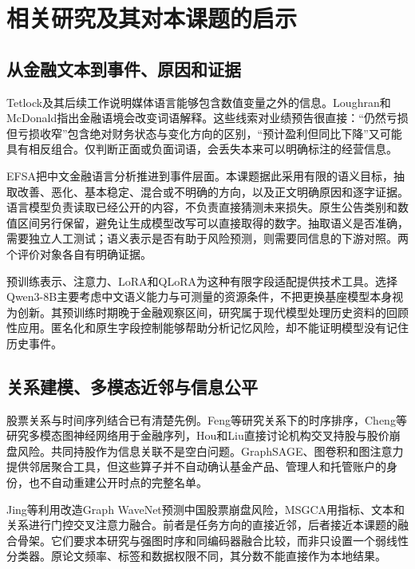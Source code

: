 \section{相关研究及其对本课题的启示}
\subsection{从金融文本到事件、原因和证据}
Tetlock及其后续工作说明媒体语言能够包含数值变量之外的信息\cite{r5,r6}。Loughran和McDonald指出金融语境会改变词语解释\cite{r7}。这些线索对业绩预告很直接：“仍然亏损但亏损收窄”包含绝对财务状态与变化方向的区别，“预计盈利但同比下降”又可能具有相反组合。仅判断正面或负面词语，会丢失本来可以明确标注的经营信息。

EFSA把中文金融语言分析推进到事件层面\cite{r24}。本课题据此采用有限的语义目标，抽取改善、恶化、基本稳定、混合或不明确的方向，以及正文明确原因和逐字证据。语言模型负责读取已经公开的内容，不负责直接猜测未来损失。原生公告类别和数值区间另行保留，避免让生成模型改写可以直接取得的数字。抽取语义是否准确，需要独立人工测试；语义表示是否有助于风险预测，则需要同信息的下游对照。两个评价对象各自有明确证据。

预训练表示、注意力、LoRA和QLoRA为这种有限字段适配提供技术工具\cite{r14,r15,r16,r21,r22,r23}。选择Qwen3-8B主要考虑中文语义能力与可测量的资源条件，不把更换基座模型本身视为创新。其预训练时期晚于金融观察区间，研究属于现代模型处理历史资料的回顾性应用。匿名化和原生字段控制能够帮助分析记忆风险，却不能证明模型没有记住历史事件。

\subsection{关系建模、多模态近邻与信息公平}
股票关系与时间序列结合已有清楚先例。Feng等研究关系下的时序排序\cite{r8}，Cheng等研究多模态图神经网络用于金融序列\cite{r9}，Hou和Liu直接讨论机构交叉持股与股价崩盘风险\cite{r10}。共同持股作为信息关联不是空白问题。GraphSAGE、图卷积和图注意力提供邻居聚合工具\cite{r17,r18,r19}，但这些算子并不自动确认基金产品、管理人和托管账户的身份，也不自动重建公开时点的完整名单。

Jing等利用改造Graph WaveNet预测中国股票崩盘风险\cite{r11,r20}，MSGCA用指标、文本和关系进行门控交叉注意力融合\cite{r12}。前者是任务方向的直接近邻，后者接近本课题的融合骨架。它们要求本研究与强图时序和同编码器融合比较，而非只设置一个弱线性分类器。原论文频率、标签和数据权限不同，其分数不能直接作为本地结果。

